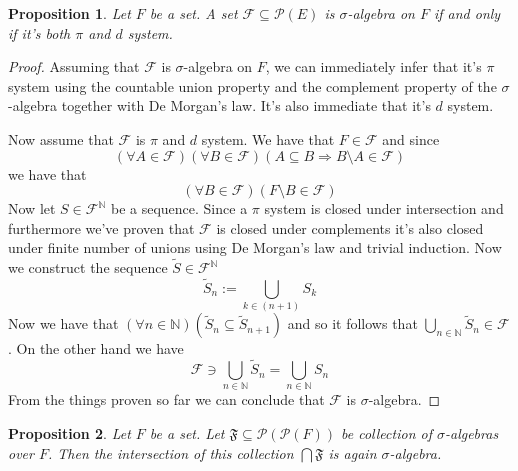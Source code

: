 \documentclass[a4paper]{amsart}
\newtheorem{prop}{Proposition}
\newcommand{\pow}[1]{\mathscr{P}\left(#1\right)}
\newcommand{\NN}{\mathbb{N}}
\begin{document}
\begin{prop}
    Let $F$ be a set. A set $\mathcal{F} \subseteq \pow{E}$ is 
    $\sigma$-algebra on $F$ if and only if it's both $\pi$ and 
    $d$ system.
\end{prop}

\begin{proof}
    Assuming that $\mathcal{F}$ is $\sigma$-algebra on $F$,
    we can immediately infer that it's $\pi$ system using the 
    countable union property and the complement property of 
    the $\sigma$-algebra together with De Morgan's law. It's 
    also immediate that it's $d$ system.
    
    Now assume that $\mathcal{F}$ is $\pi$ and $d$ system. We have that $F \in \mathcal{F}$
    and since
    $$\left(\forall A \in \mathcal{F}\right) \left(\forall B \in \mathcal{F}\right)
    \left( A \subseteq B \Longrightarrow B \setminus A \in\mathcal{F} \right)$$
    we have that
    $$\left(\forall B \in \mathcal{F}\right)  \left( F \setminus B \in \mathcal{F} \right)$$
    Now let $S\in \mathcal{F}^\NN$ be a sequence. 
    Since a $\pi$ system is closed under intersection and 
    furthermore we've proven that 
    $\mathcal{F}$ is closed under complements it's also 
    closed under finite number of unions using De Morgan's 
    law and trivial induction. Now we construct the sequence $\tilde{S}\in \mathcal{F}^\NN$
    $$
    \tilde{S}_n := \bigcup\limits_{k\in (n + 1)} S_k
    $$
    Now we have that 
    $ \left(\forall n \in \NN\right) \left( \tilde{S}_n  \subseteq \tilde{S}_{n+1} \right)$
    and so it follows that
    $\bigcup\limits_{n\in \NN} \tilde{S}_n \in \mathcal{F}$.
    On the other hand we have
    $$
    \mathcal{F} \ni \bigcup\limits_{n\in \NN} \tilde{S}_n = \bigcup\limits_{n\in \NN} S_n 
    $$
    From the things proven so far we can conclude that $\mathcal{F}$ is $\sigma$-algebra.
\end{proof}

\begin{prop}
    Let $F$ be a set. Let $\mathfrak{F} \subseteq \pow{\pow{F}}$ be collection of $\sigma$-algebras over $F$. Then the intersection of this collection $\bigcap \mathfrak{F}$ is again $\sigma$-algebra.
\end{prop}
\end{document}
